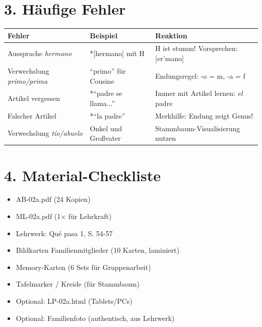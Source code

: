 \documentclass[11pt, a4paper]{article}
\newcommand{\lerngruppengroesse}{24}
\begin{document}

\section*{3. Häufige Fehler}

\begin{fehlerbox}
\begin{tabularx}{\textwidth}{|l|X|X|}
\hline
\textbf{Fehler} & \textbf{Beispiel} & \textbf{Reaktion} \\
\hline
Aussprache \textit{hermano} & *[hermano] mit H & H ist stumm! Vorsprechen: [er'mano] \\
\hline
Verwechslung \textit{primo/prima} & ``primo'' für Cousine & Endungsregel: -o = m, -a = f \\
\hline
Artikel vergessen & *``padre se llama...'' & Immer mit Artikel lernen: \textit{el} padre \\
\hline
Falscher Artikel & *``la padre'' & Merkhilfe: Endung zeigt Genus! \\
\hline
Verwechslung \textit{tío/abuelo} & Onkel und Großvater & Stammbaum-Visualisierung nutzen \\
\hline
\end{tabularx}
\end{fehlerbox}


\section*{4. Material-Checkliste}

\begin{materialbox}
\begin{itemize}[label=$\square$]
    \item AB-02a.pdf (\lerngruppengroesse{} Kopien)
    \item ML-02a.pdf (1$\times$ für Lehrkraft)
    \item Lehrwerk: Qué pasa 1, S. 54-57
    \item Bildkarten Familienmitglieder (10 Karten, laminiert)
    \item Memory-Karten (6 Sets für Gruppenarbeit)
    \item Tafelmarker / Kreide (für Stammbaum)
    \item Optional: LP-02a.html (Tablets/PCs)
    \item Optional: Familienfoto (authentisch, aus Lehrwerk)
\end{itemize}
\end{materialbox}
\end{document}
